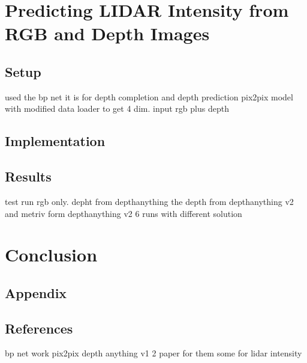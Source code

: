 \chapter{Predicting LIDAR Intensity from RGB and Depth Images}
\section{Setup}
used the bp net it is for depth completion and depth prediction
pix2pix model with modified data loader to get 4 dim. input rgb plus depth
\section{Implementation}
\section{Results}
test run rgb only. depht from depthanything the depth from depthanything v2 and metriv form depthanything v2 6 runs with different solution
\chapter{Conclusion}
\section{Appendix}

\section{References}
bp net work
pix2pix
depth anything v1 2
paper for them 
some for lidar intensity
